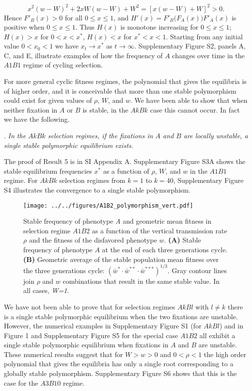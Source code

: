 \documentclass[9pt,twocolumn,twoside,lineno]{pnas-new}
\begin{document}
 \begin{equation}x^2\left(w-W\right)^2 +2xW(w-W) +W^2 =\left[x(w-W) +W\right]^2 >0.\label{27}\end{equation}
  Hence $F'_{B}(x)>0$ for all $0\le x\le 1$, and $H'(x) =F'_B\bigl(F_A(x)\bigr)F'_A(x)$ is positive when $0\le x\le 1$. Thus $H(x)$ is monotone increasing for $0\le x\le 1$; $H(x)>x$ for $0<x<x^*$, $H(x)<x$ for $x^*<x<1$.
Starting from any initial value $0<x_0 <1$ we have  $x_t\to x^*$ as $t\to\infty$. Supplementary Figure S2, panels A, C, and E, illustrate examples of how the frequency of $A$ changes over time in the $A1B1$ regime of cycling selection. 

For more general cyclic fitness regimes, the polynomial that gives the equilibria is of higher order, and it is conceivable that more than one stable polymorphism could exist for given values of $\rho$, $W$, and $w$. We have been able to show that when neither fixation in $A$ or $B$ is stable, in the $AkBk$ case this cannot occur. In fact we have the following.
\medskip

. {\sl In the $AkBk$ selection regimes, if the fixations in $A$ and $B$ are locally unstable, a single stable polymorphic equilibrium exists.}\par
\medskip

The proof of Result 5 is in SI Appendix A. Supplementary Figure S3A shows the stable equilibrium frequencies $x^*$ as a function of $\rho$, $W$, and $w$ in the $A1B1$ regime.
For $AkBk$ selection regimes from $k=1$ to $k=40$, Supplementary Figure S4 illustrates the convergence to a single stable polymorphism. 

\begin{figure}[h]
\centering
\texttt{[image: ../../figures/A1B2\_polymorphism\_vert.pdf]}
\caption{Stable frequency of phenotype \emph{A} and geometric mean fitness in selection regime
$A1B2$ as a function of the vertical transmission rate \(\rho\) and the fitness of the disfavored phenotype \(w\).
\textbf{(A)} Stable frequency of phenotype $A$ at the end of each three generations cycle.
\textbf{(B)} Geometric average of the stable population mean fitness over the three generations cycle: $(\bar{w}^* \cdot \bar{w}^{**} \cdot \bar{w}^{***})^{1/3}$.
Gray contour lines join \(\rho\) and \(w\) combinations that result in the same stable value.
In all cases, \emph{W=1}.}\label{fig:A1B2_polymorphism}
\end{figure}

We have not been able to prove that for selection regimes $AkBl$ with $l\ne k$ there is a single stable polymorphic equilibrium when the two fixations are unstable. However, the numerical examples in Supplementary Figure S1 (for $AkBl$) and in Figure 1 and Supplementary Figure S5 for the special case $A1B2$ all exhibit a single stable polymorphic equilibrium when fixations in $A$ and $B$ are unstable. These numerical results suggest that for $W>w>0$ and $0<\rho<1$ the high order polynomial that gives the equilibria has only a single root corresponding to a globally stable polymorphism. Supplementary Figure S6 shows that this is the case for the $A3B10$ regime.
\end{document}
